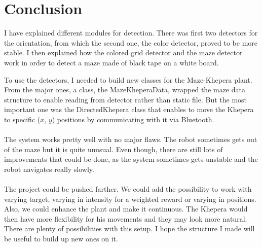 \chapter{Conclusion}
\label{sec:conclusion}

I have explained different modules for detection. There was first two 
detectors for the orientation, from which the second one, the color 
detector, proved to be more stable. I then explained how the colored 
grid detector and the maze detector work in order to detect a maze made 
of black tape on a white board.

To use the detectors, I needed to build new classes for the Maze-Khepera 
plant. From the major ones, a class, the MazeKheperaData, wrapped the 
maze data structure to enable reading from detector rather than static 
file. But the most important one was the DirectedKhepera class that 
enables to move the Khepera to specific ($x$, $y$) positions by 
communicating with it via Bluetooth. 
\\
\\
The system works pretty well with no major flaws. The robot sometimes 
gets out of the maze but it is quite unusual. Even though, there are 
still lots of improvements that could be done, as the system sometimes 
gets unstable and the robot navigates really slowly. 
\\
\\
The project could be pushed farther. We could add the possibility to 
work with varying target, varying in intensity for a weighted reward or 
varying in positions. Also, we could enhance the plant and make it 
continuous. The Khepera would then have more flexibility for his 
movements and they may look more natural. There are plenty of 
possibilities with this setup. I hope the structure I made will be 
useful to build up new ones on it. 
